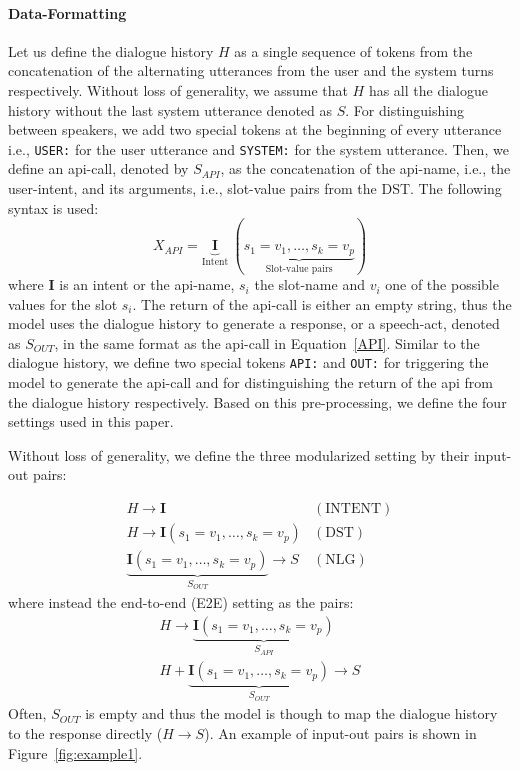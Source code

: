 \documentclass[11pt,a4paper]{article}
\begin{document}
\paragraph{Data-Formatting} Let us define the dialogue history $H$ as a single sequence of tokens from the concatenation of the alternating utterances from the user and the system turns respectively. Without loss of generality, we assume that $H$ has all the dialogue history without the last system utterance denoted as $S$. For distinguishing between speakers, we add two special tokens at the beginning of every utterance i.e., \texttt{USER:} for the user utterance and \texttt{SYSTEM:} for the system utterance. Then, we define an api-call, denoted by $S_{API}$, as the concatenation of the api-name, i.e., the user-intent, and its arguments, i.e., slot-value pairs from the DST. The following syntax is used:  
\begin{equation}
X_{API} = \underbrace{\mathbf{I}}_{\text{Intent}} \ (\underbrace{s_{1}=v_{1}, \ldots,s_{k}=v_{p}}_{\text {Slot-value pairs}}) \label{API}
\end{equation}
where $\mathbf{I}$ is an intent or the api-name, $s_i$ the slot-name and $v_i$ one of the possible values for the slot $s_i$. The return of the api-call is either an empty string, thus the model uses the dialogue history to generate a response, or a speech-act, denoted as $S_{OUT}$, in the same format as the api-call in Equation~\ref{API}. Similar to the dialogue history, we define two special tokens \texttt{API:} and \texttt{OUT:} for triggering the model to generate the api-call and for distinguishing the return of the api from the dialogue history respectively. Based on this pre-processing, we define the four settings used in this paper.

Without loss of generality, we define the three modularized setting by their input-out pairs: 

\[
\begin{array}{cc}
H \rightarrow \mathbf{I} & \mathrm{(INTENT)} \\
H \rightarrow \mathbf{I}(s_{1}=v_{1}, \ldots,s_{k}=v_{p}) & \mathrm{(DST)} \\
\underbrace{\mathbf{I}(s_{1}=v_{1}, \ldots,s_{k}=v_{p})}_{S_{OUT}}\rightarrow S & \mathrm{(NLG)}
\end{array}
\]
where instead the end-to-end (E2E) setting as the pairs:
\[
\begin{array}{c}
 H \rightarrow \underbrace{\mathbf{I}(s_{1}=v_{1}, \ldots,s_{k}=v_{p})}_{S_{API}} \\
H + \underbrace{\mathbf{I}(s_{1}=v_{1}, \ldots,s_{k}=v_{p})}_{S_{OUT}}\rightarrow S
\end{array}
\]
Often, $S_{OUT}$ is empty and thus the model is though to map the dialogue history to the response directly ($H \rightarrow S$). An example of input-out pairs is shown in Figure~\ref{fig:example1}. 
\end{document}

